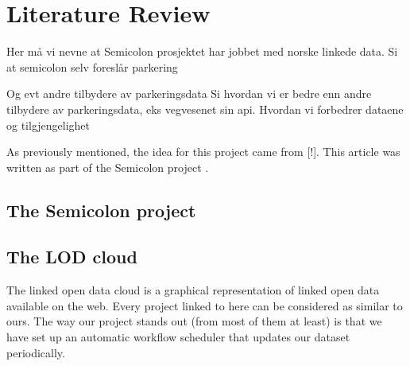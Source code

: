 \chapter{Literature Review}

Her må vi nevne at Semicolon prosjektet har jobbet med norske linkede data. 
Si at semicolon selv foreslår parkering

Og evt andre tilbydere av parkeringsdata
Si hvordan vi er bedre enn andre tilbydere av parkeringsdata, eks vegvesenet sin api. Hvordan vi forbedrer dataene og tilgjengelighet


As previously mentioned, the idea for this project came from [!]. This article was written as part of the Semicolon project \cite{semicolon}.


\section{The Semicolon project}


\section{The LOD cloud}
The linked open data cloud is a graphical representation of linked open data available on the web. Every project linked to here can be considered as similar to ours. The way our project stands out (from most of them at least) is that we have set up an automatic workflow scheduler that updates our dataset periodically. 